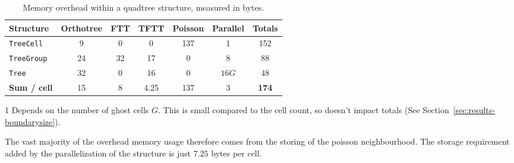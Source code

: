 \documentclass[twoside]{IIBproject}
\numberwithin{figure}{section}
\begin{document}
        \begin{table}[H]
            \centering
            \caption{Memory overhead within a quadtree structure, measured in bytes.}
            \label{tab:results-memusage}
            \begin{threeparttable}
                \begin{tabular}{@{}l>{\hskip 1cm}ccccc>{\hskip 1cm}c@{}}
                \toprule
                \textbf{Structure}  & Orthotree & FTT & TFTT & Poisson & Parallel & \textbf{Totals} \\ \midrule
                \texttt{TreeCell}   & 9         & 0   & 0    & 137     & 1        & 152    \\ %
                \texttt{TreeGroup}  & 24        & 32  & 17   & 0       & 8        & 88     \\ %
                \texttt{Tree}       & 32        & 0   & 16   & 0       & $16G$\tnote{1}        & 48     \\ \addlinespace[4mm] \cmidrule{7-7} %
                \textbf{Sum / cell} & 15        & 8   & 4.25 & 137     & 3        & \textbf{174}    \\ \bottomrule
                \end{tabular}
                \begin{tablenotes}
                    \item[1] Depends on the number of ghost cells $G$. This is small compared to the cell count, so doesn't impact totals (See Section~\ref{sec:results-boundarysize}).
                \end{tablenotes}
            \end{threeparttable}
        \end{table}

        The vast majority of the overhead memory usage therefore comes from the storing of the poisson neighbourhood. The storage requirement added by the parallelization of the structure is just $7.25$ bytes per cell. 






\end{document}
